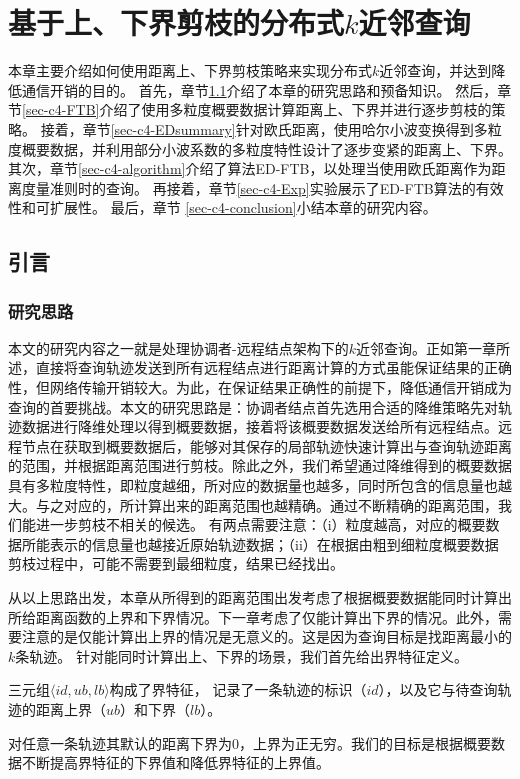\chapter{基于上、下界剪枝的分布式$k$近邻查询}\label{chapter:FTBED}

本章主要介绍如何使用距离上、下界剪枝策略来实现分布式$k$近邻查询，并达到降低通信开销的目的。
首先，章节\ref{sec-c4-introduction}介绍了本章的研究思路和预备知识。
然后，章节\ref{sec-c4-FTB}介绍了使用多粒度概要数据计算距离上、下界并进行逐步剪枝的策略。
接着，章节\ref{sec-c4-EDsummary}针对欧氏距离，使用哈尔小波变换得到多粒度概要数据，并利用部分小波系数的多粒度特性设计了逐步变紧的距离上、下界。
其次，章节\ref{sec-c4-algorithm}介绍了算法ED-FTB，以处理当使用欧氏距离作为距离度量准则时的查询。
再接着，章节\ref{sec-c4-Exp}实验展示了ED-FTB算法的有效性和可扩展性。
最后，章节 \ref{sec-c4-conclusion}小结本章的研究内容。
\section{引言}\label{sec-c4-introduction}
\subsection{研究思路}
本文的研究内容之一就是处理协调者-远程结点架构下的$k$近邻查询。正如第一章所述，直接将查询轨迹发送到所有远程结点进行距离计算的方式虽能保证结果的正确性，但网络传输开销较大。为此，在保证结果正确性的前提下，降低通信开销成为查询的首要挑战。本文的研究思路是：协调者结点首先选用合适的降维策略先对轨迹数据进行降维处理以得到概要数据，接着将该概要数据发送给所有远程结点。远程节点在获取到概要数据后，能够对其保存的局部轨迹快速计算出与查询轨迹距离的范围，并根据距离范围进行剪枝。除此之外，我们希望通过降维得到的概要数据具有多粒度特性，即粒度越细，所对应的数据量也越多，同时所包含的信息量也越大。与之对应的，所计算出来的距离范围也越精确。通过不断精确的距离范围，我们能进一步剪枝不相关的候选。
有两点需要注意：（i）粒度越高，对应的概要数据所能表示的信息量也越接近原始轨迹数据；（ii）在根据由粗到细粒度概要数据剪枝过程中，可能不需要到最细粒度，结果已经找出。

从以上思路出发，本章从所得到的距离范围出发考虑了根据概要数据能同时计算出所给距离函数的上界和下界情况。下一章考虑了仅能计算出下界的情况。此外，需要注意的是仅能计算出上界的情况是无意义的。这是因为查询目标是找距离最小的$k$条轨迹。
针对能同时计算出上、下界的场景，我们首先给出界特征定义。
\begin{define} 三元组$\langle id, ub,lb \rangle$构成了界特征， 记录了一条轨迹的标识（$id$），以及它与待查询轨迹的距离上界（$ub$）和下界（$lb$）。
\end{define}
对任意一条轨迹其默认的距离下界为0，上界为正无穷。我们的目标是根据概要数据不断提高界特征的下界值和降低界特征的上界值。

